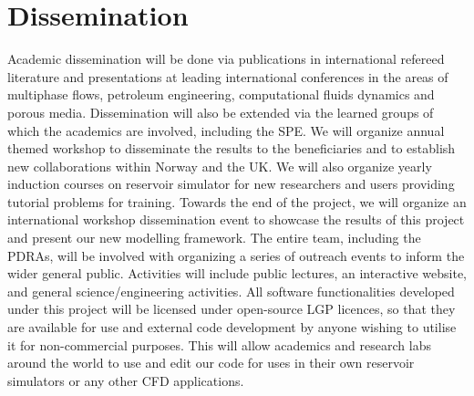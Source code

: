 \documentclass[12pts,a4paper,amsmath,amssymb,floatfix]{article}%
\begin{document}
\section{Dissemination}

Academic dissemination will be done via publications in international refereed literature and presentations at leading international conferences in the areas of multiphase flows, petroleum engineering, computational fluids dynamics and porous media.
Dissemination will also be extended via the learned groups of which the academics are involved, including the SPE. We will organize annual themed workshop to disseminate the results to the beneficiaries and to establish new collaborations within Norway and the UK. We will also organize yearly induction courses on reservoir simulator for new researchers and users providing tutorial problems for training. Towards the end of the project, we will organize an international workshop dissemination event to showcase the results of this project and present our new modelling framework. The entire team, including the PDRAs, will be involved with organizing a series of outreach events to inform the wider general public. Activities will include public lectures, an interactive website, and general science/engineering activities. 
All software functionalities developed under this project will be licensed under open-source LGP licences, so that they are available for use and external code development by anyone wishing to utilise it for non-commercial purposes.  This will allow academics and research labs around the world to use and edit our code for uses in their own reservoir simulators or any other CFD applications.

 
\end{document}
